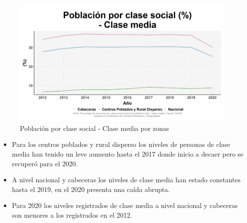     \begin{figure}[H]
        \caption{Población por clase social - Clase media por zonas \label{map_result_2} }
        \begin{center}
        \includegraphics[width=\textwidth,keepaspectratio]{img/var_249_trend.png}
        \end{center}
    \end{figure}
            \begin{itemize}
                    \item Para los centros poblados y rural disperso los niveles de personas de clase media han tenido un leve aumento hasta el 2017 donde inicio a decaer pero se recuperó para el 2020.
                    \item A nivel nacional y cabeceras los niveles de clase media han estado constantes hasta el 2019, en el 2020 presenta una caída abrupta.
                    \item Para 2020 los niveles registrados de clase media a nivel nacional y cabeceras son menores a los registrados en el 2012.
                    \end{itemize}

